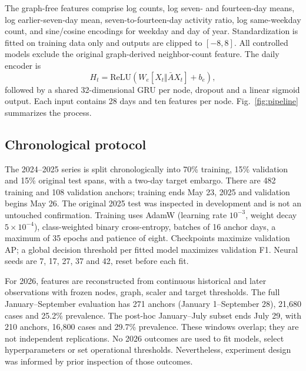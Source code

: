 \documentclass[conference]{IEEEtran}
\begin{document}
The graph-free features comprise log counts, log seven- and fourteen-day means, log earlier-seven-day mean, seven-to-fourteen-day activity ratio, log same-weekday count, and sine/cosine encodings for weekday and day of year. Standardization is fitted on training data only and outputs are clipped to $[-8,8]$. All controlled models exclude the original graph-derived neighbor-count feature. The daily encoder is
\begin{equation}
H_t=\mathrm{ReLU}(W_e[X_t\Vert\bar A X_t]+b_e),
\end{equation}
followed by a shared 32-dimensional GRU per node, dropout and a linear sigmoid output. Each input contains 28 days and ten features per node. Fig.~\ref{fig:pipeline} summarizes the process.

\subsection{Chronological protocol}
The 2024--2025 series is split chronologically into 70\% training, 15\% validation and 15\% original test spans, with a two-day target embargo. There are 482 training and 108 validation anchors; training ends May 23, 2025 and validation begins May 26. The original 2025 test was inspected in development and is not an untouched confirmation. Training uses AdamW (learning rate $10^{-3}$, weight decay $5\times10^{-4}$), class-weighted binary cross-entropy, batches of 16 anchor days, a maximum of 35 epochs and patience of eight. Checkpoints maximize validation AP; a global decision threshold per fitted model maximizes validation F1. Neural seeds are 7, 17, 27, 37 and 42, reset before each fit.

For 2026, features are reconstructed from continuous historical and later observations with frozen nodes, graph, scaler and target thresholds. The full January--September evaluation has 271 anchors (January 1--September 28), 21,680 cases and 25.2\% prevalence. The post-hoc January--July subset ends July 29, with 210 anchors, 16,800 cases and 29.7\% prevalence. These windows overlap; they are not independent replications. No 2026 outcomes are used to fit models, select hyperparameters or set operational thresholds. Nevertheless, experiment design was informed by prior inspection of those outcomes.
\end{document}
